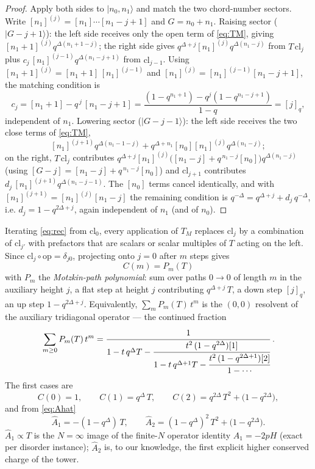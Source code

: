 \documentclass[11pt]{article}
\newcommand{\cl}{\mathrm{cl}}
\newcommand{\op}{\mathrm{op}}
\begin{document}
\begin{proof}
Apply both sides to $|n_0,n_1\rangle$ and match the two chord-number
sectors. Write $[n_1]^{(j)}=[n_1]\cdots[n_1{-}j{+}1]$ and
$G=n_0+n_1$. Raising sector ($|G-j+1\rangle$): the left side receives only
the open term of \eqref{eq:TM}, giving $[n_1{+}1]^{(j)}q^{\Delta(n_1+1-j)}$;
the right side gives $q^{\Delta+j}[n_1]^{(j)}q^{\Delta(n_1-j)}$ from
$T\,\cl_j$ plus $c_j\,[n_1]^{(j-1)}q^{\Delta(n_1-j+1)}$ from $\cl_{j-1}$.
Using $[n_1{+}1]^{(j)}=[n_1{+}1]\,[n_1]^{(j-1)}$ and
$[n_1]^{(j)}=[n_1]^{(j-1)}[n_1{-}j{+}1]$, the matching condition is
\begin{equation}
c_j=[n_1{+}1]-q^{\,j}\,[n_1{-}j{+}1]
=\frac{(1-q^{n_1+1})-q^j(1-q^{n_1-j+1})}{1-q}=[j]_q ,
\end{equation}
independent of $n_1$. Lowering sector ($|G-j-1\rangle$): the left side
receives the two close terms of \eqref{eq:TM},
\[
[n_1]^{(j+1)}q^{\Delta(n_1-1-j)}+q^{\Delta+n_1}[n_0][n_1]^{(j)}q^{\Delta(n_1-j)};
\]
on the right, $T\,\cl_j$ contributes
$q^{\Delta+j}[n_1]^{(j)}\big([n_1{-}j]+q^{\,n_1-j}[n_0]\big)q^{\Delta(n_1-j)}$
(using $[G-j]=[n_1{-}j]+q^{\,n_1-j}[n_0]$) and $\cl_{j+1}$ contributes
$d_j\,[n_1]^{(j+1)}q^{\Delta(n_1-j-1)}$. The $[n_0]$ terms cancel
identically, and with $[n_1]^{(j+1)}=[n_1]^{(j)}[n_1{-}j]$ the remaining
condition is $q^{-\Delta}=q^{\Delta+j}+d_j\,q^{-\Delta}$, i.e.
$d_j=1-q^{2\Delta+j}$, again independent of $n_1$ (and of $n_0$).
\end{proof}

Iterating \eqref{eq:rec} from $\cl_0$, every application of $T_M$ replaces
$\cl_j$ by a combination of $\cl_{j'}$ with prefactors that are scalars or
scalar multiples of $T$ acting on the left. Since
$\cl_{j}\circ\op=\delta_{j0}$, projecting onto $j=0$ after $m$ steps gives
\begin{equation}
\boxed{\;C(m)=P_m(T)\;}
\end{equation}
with $P_m$ the \emph{Motzkin-path polynomial}: sum over paths
$0\to0$ of length $m$ in the auxiliary height $j$, a flat step at height
$j$ contributing $q^{\Delta+j}\,T$, a down step $[j]_q$, an up step
$1-q^{2\Delta+j}$. Equivalently, $\sum_m P_m(T)\,t^m$ is the $(0,0)$
resolvent of the auxiliary tridiagonal operator --- the continued fraction
\begin{equation}
\sum_{m\ge0}P_m(T)\,t^m=
\cfrac{1}{1-t\,q^{\Delta}T-
 \cfrac{t^2\,(1-q^{2\Delta})[1]}{1-t\,q^{\Delta+1}T-
  \cfrac{t^2\,(1-q^{2\Delta+1})[2]}{1-\cdots}}} \; .
\end{equation}
The first cases are
\begin{equation}
C(0)=1,\qquad
C(1)=q^{\Delta}\,T,\qquad
C(2)=q^{2\Delta}\,T^2+\big(1-q^{2\Delta}\big),
\end{equation}
and from \eqref{eq:Ahat}
\begin{equation}
\widehat A_1=-(1-q^{\Delta})\,T,
\qquad
\widehat A_2=(1-q^{\Delta})^2\,T^2+\big(1-q^{2\Delta}\big).
\end{equation}
$\widehat A_1\propto T$ is the $N=\infty$ image of the finite-$N$ operator
identity $A_1=-2pH$ (exact per disorder instance); $\widehat A_2$ is, to
our knowledge, the first explicit higher conserved charge of the tower.
\end{document}
